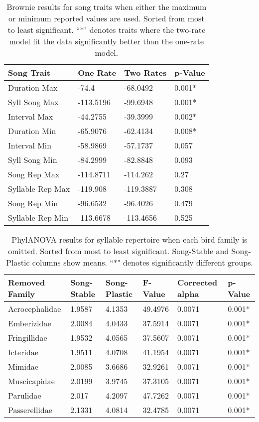 \documentclass[a4paper,12pt]{article}
\begin{document}
\begin{table}[ht]
\caption{Brownie results for song traits when either the maximum or minimum reported values are used.  Sorted from most to least significant.  ``*" denotes traits where the two-rate model fit the data significantly better than the one-rate model.}
\centering
\begin{tabular}{llll}
  \hline
Song Trait & One Rate & Two Rates & p-Value \\ 
  \hline
Duration Max & -74.4 & -68.0492 & 0.001* \\ 
  Syll Song Max & -113.5196 & -99.6948 & 0.001* \\ 
  Interval Max & -44.2755 & -39.3999 & 0.002* \\ 
  Duration Min & -65.9076 & -62.4134 & 0.008* \\ 
  Interval Min & -58.9869 & -57.1737 & 0.057 \\ 
  Syll Song Min & -84.2999 & -82.8848 & 0.093 \\ 
  Song Rep Max & -114.8711 & -114.262 & 0.27 \\ 
  Syllable Rep Max & -119.908 & -119.3887 & 0.308 \\ 
  Song Rep Min & -96.6532 & -96.4026 & 0.479 \\ 
  Syllable Rep Min & -113.6678 & -113.4656 & 0.525 \\ 
   \hline
\end{tabular}
\end{table}

\begin{table}[ht]
\caption{PhylANOVA results for syllable repertoire when each bird family is omitted.  Sorted from most to least significant.  Song-Stable and Song-Plastic columns show means.  ``*" denotes significantly different groups.}
\centering
\begin{tabular}{llllll}
  \hline
Removed Family & Song-Stable & Song-Plastic & F-Value & Corrected alpha & p-Value \\ 
  \hline
Acrocephalidae & 1.9587 & 4.1353 & 49.4976 & 0.0071 & 0.001* \\ 
  Emberizidae & 2.0084 & 4.0433 & 37.5914 & 0.0071 & 0.001* \\ 
  Fringillidae & 1.9532 & 4.0565 & 37.5607 & 0.0071 & 0.001* \\ 
  Icteridae & 1.9511 & 4.0708 & 41.1954 & 0.0071 & 0.001* \\ 
  Mimidae & 2.0085 & 3.6686 & 32.9261 & 0.0071 & 0.001* \\ 
  Muscicapidae & 2.0199 & 3.9745 & 37.3105 & 0.0071 & 0.001* \\ 
  Parulidae & 2.017 & 4.2097 & 47.7262 & 0.0071 & 0.001* \\ 
  Passerellidae & 2.1331 & 4.0814 & 32.4785 & 0.0071 & 0.001* \\ 
   \hline
\end{tabular}
\end{table}
\end{document}
